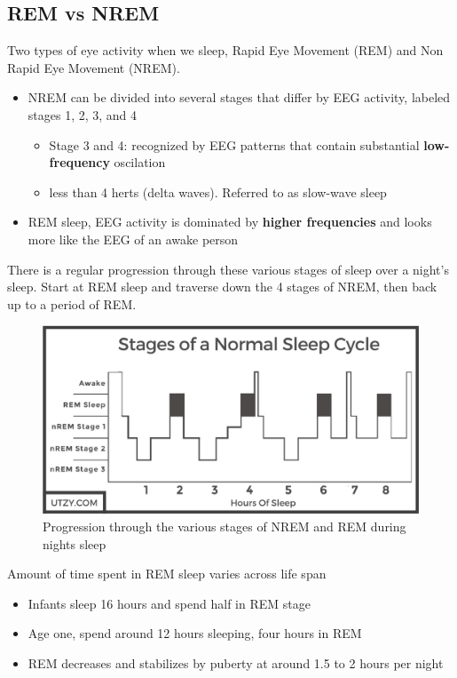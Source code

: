 \documentclass{article}
\begin{document}
\subsection{REM vs NREM}
Two types of eye activity when we sleep, Rapid Eye Movement (REM) and Non Rapid Eye Movement (NREM).
\begin{itemize}
    \item NREM can be divided into several stages that differ by EEG activity, labeled stages 1, 2, 3, and 4
    \begin{itemize}
        \item Stage 3 and 4: recognized by EEG patterns that contain substantial \textbf{low-frequency} oscilation
            \item less than 4 herts (delta waves). Referred to as slow-wave sleep
    \end{itemize}
    \item REM sleep, EEG activity is dominated by \textbf{higher frequencies} and looks more like the EEG of an awake person
\end{itemize}
There is a regular progression through these various stages of sleep over a night's sleep. Start at REM sleep and traverse down the 4 stages of NREM, then back up to a period of REM. \label{Sleep Stages}

\begin{figure}[htp]
\centering
\includegraphics[width=\textwidth]{images/sleepstages.png}
\caption{Progression through the various stages of NREM and REM during nights sleep}
\label{fig: Sleep Stages}
\end{figure}

\newpage
Amount of time spent in REM sleep varies across life span 
\begin{itemize}
    \item Infants sleep 16 hours and spend half in REM stage
    \item Age one, spend around 12 hours sleeping, four hours in REM
    \item REM decreases and stabilizes by puberty at around 1.5 to 2 hours per night
\end{itemize}
\end{document}
